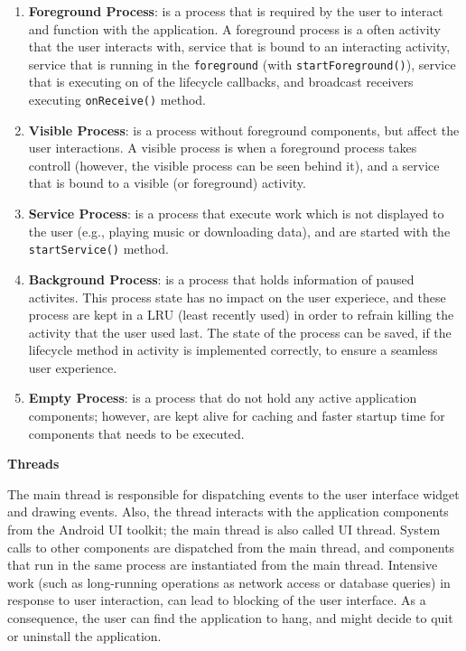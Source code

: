 \begin{enumerate}
    \item \textbf{Foreground Process}: is a process that is required by the user to interact and function with the application. A foreground process is a often activity that the user interacts with, service that is bound to an interacting activity, service that is running in the \verb|foreground| (with \verb|startForeground()|), service that is executing on of the lifecycle callbacks, and broadcast receivers executing \verb|onReceive()| method.
    \item \textbf{Visible Process}: is a process without foreground components, but affect the user interactions. A visible process is when a foreground process takes controll (however, the visible process can be seen behind it), and a service that is bound to a visible (or foreground) activity. 
    \item \textbf{Service Process}: is a process that execute work which is not displayed to the user (e.g., playing music or downloading data), and are started with the \verb|startService()| method. 
    \item \textbf{Background Process}: is a process that holds information of paused activites. This process state has no impact on the user experiece, and these process are kept in a LRU (least recently used) in order to refrain killing the activity that the user used last. The state of the process can be saved, if the lifecycle method in activity is implemented correctly, to ensure a seamless user experience. 
    \item \textbf{Empty Process}: is a process that do not hold any active application components; however, are kept alive for caching and faster startup time for components that needs to be executed.  
\end{enumerate}

\noindent \textbf{Threads}

\noindent The main thread is responsible for dispatching events to the user interface widget and drawing events. Also, the thread interacts with the application components from the Android UI toolkit; the main thread is also called UI thread. System calls to other components are dispatched from the main thread, and components that run in the same process are instantiated from the main thread. Intensive work (such as long-running operations as network access or database queries) in response to user interaction, can lead to blocking of the user interface. As a consequence, the user can find the application to hang, and might decide to quit or uninstall the application. 

